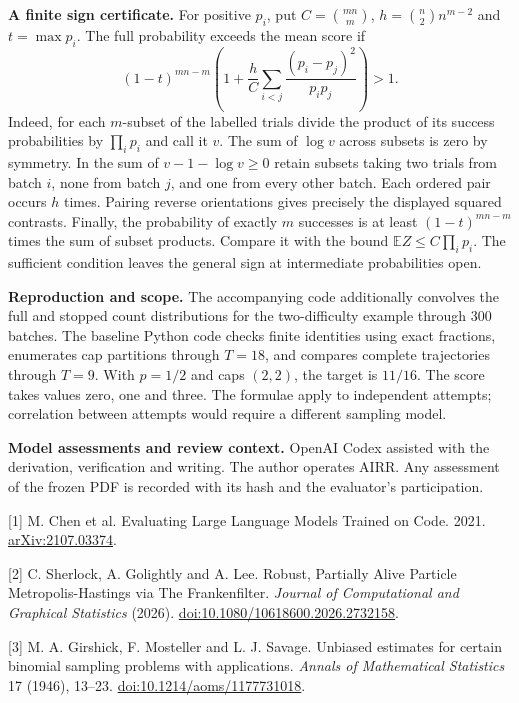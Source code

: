 \documentclass[11pt]{article}
\begin{document}
\textbf{A finite sign certificate.} For positive $p_i$, put $C=\binom{mn}{m}$, $h=\binom{n}{2}n^{m-2}$ and $t=\max p_i$. The full probability exceeds the mean score if
\[
(1-t)^{mn-m}\left(1+\frac{h}{C}\sum_{i<j}\frac{(p_i-p_j)^2}{p_i p_j}\right)>1 .
\]
Indeed, for each $m$-subset of the labelled trials divide the product of its success probabilities by $\prod_i p_i$ and call it $v$. The sum of $\log v$ across subsets is zero by symmetry. In the sum of $v-1-\log v\ge0$ retain subsets taking two trials from batch $i$, none from batch $j$, and one from every other batch. Each ordered pair occurs $h$ times. Pairing reverse orientations gives precisely the displayed squared contrasts. Finally, the probability of exactly $m$ successes is at least $(1-t)^{mn-m}$ times the sum of subset products. Compare it with the bound $\mathbb E Z\le C\prod_i p_i$. The sufficient condition leaves the general sign at intermediate probabilities open.


\textbf{Reproduction and scope.} The accompanying code additionally convolves the full and stopped count distributions for the two-difficulty example through 300 batches. The baseline Python code checks finite identities using exact fractions, enumerates cap partitions through $T=18$, and compares complete trajectories through $T=9$. With $p=1/2$ and caps $(2,2)$, the target is $11/16$. The score takes values zero, one and three. The formulae apply to independent attempts; correlation between attempts would require a different sampling model.

\textbf{Model assessments and review context.} OpenAI Codex assisted with the derivation, verification and writing. The author operates AIRR. Any assessment of the frozen PDF is recorded with its hash and the evaluator's participation.

\small
[1] M. Chen et al. Evaluating Large Language Models Trained on Code. 2021. \href{https://arxiv.org/abs/2107.03374}{arXiv:2107.03374}.

[2] C. Sherlock, A. Golightly and A. Lee. Robust, Partially Alive Particle Metropolis-Hastings via The Frankenfilter. \emph{Journal of Computational and Graphical Statistics} (2026). \href{https://doi.org/10.1080/10618600.2026.2732158}{doi:10.1080/10618600.2026.2732158}.

[3] M. A. Girshick, F. Mosteller and L. J. Savage. Unbiased estimates for certain binomial sampling problems with applications. \emph{Annals of Mathematical Statistics} 17 (1946), 13--23. \href{https://doi.org/10.1214/aoms/1177731018}{doi:10.1214/aoms/1177731018}.
\end{document}
